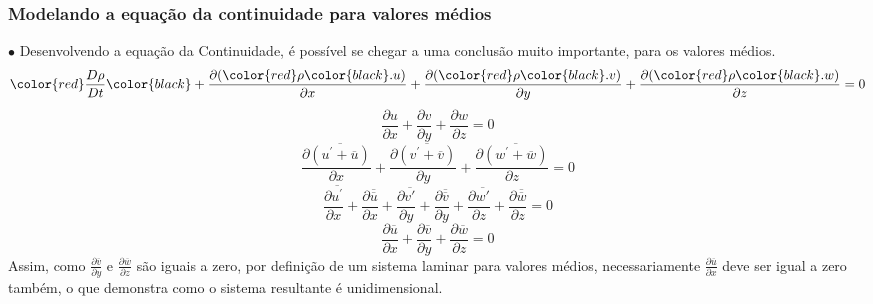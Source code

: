 \documentclass[xcolor=dvipsnames,10pt,aspectratio=169]{beamer}
\begin{document}
		
		
		
		
		\begin{frame}
			\frametitle{Modelando a equação da continuidade para valores médios}
			$\bullet$ Desenvolvendo a equação da Continuidade, é possível se chegar a uma conclusão muito importante, para os valores médios.
			\begin{equation*}
			\color{red}\frac{D \rho}{D t} \color{black}+  \frac{\partial (\color{red}\rho \color{black}.u)}{\partial x} + \frac{\partial (\color{red} \rho \color{black}.v)}{\partial y} + \frac{\partial (\color{red}\rho \color{black}.w)}{\partial z} = 0
			\end{equation*}
			\begin{equation}
			\frac{\partial u}{\partial x} + \frac{\partial v}{\partial y} + \frac{\partial w}{\partial z} = 0
			\end{equation}
			\begin{equation}
			\frac{\partial \overline{(u^\prime + \overline{u})}}{\partial x} + \frac{\partial \overline{(v^\prime + \overline{v})}}{\partial y} + \frac{\partial \overline{(w^\prime + \overline{w})}}{\partial z} = 0
			\end{equation}
			\begin{equation}
			\frac{\partial \overline{u^\prime}}{\partial x} +\frac{\partial \overline{\overline{u}}}{\partial x} + \frac{\partial \overline{v\prime}}{\partial y} +\frac{\partial \overline{\overline{v}}}{\partial y} + \frac{\partial \overline{w\prime}}{\partial z} +\frac{\partial \overline{\overline{w}}}{\partial z} = 0
			\end{equation}
			\begin{equation}
			\frac{\partial {\overline{u}}}{\partial x} +\frac{\partial {\overline{v}}}{\partial y} +\frac{\partial {\overline{w}}}{\partial z} = 0
			\end{equation}
			Assim, como $ \frac{\partial {\overline{v}}}{\partial y} $ e $ \frac{\partial {\overline{w}}}{\partial z}$ são iguais a zero, por definição de um sistema laminar para valores médios, necessariamente $\frac{\partial {\overline{u}}}{\partial x}$ deve ser igual a zero também, o que demonstra como o sistema resultante é unidimensional.
		\end{frame}
		
		
		
\end{document}
